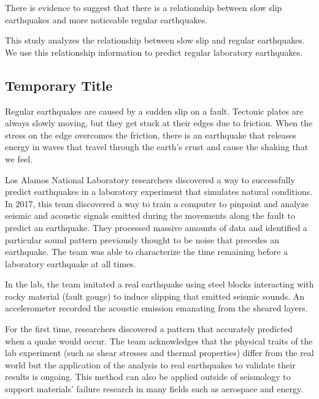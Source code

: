 \documentclass[]{llncs}
\begin{document}
There is evidence to suggest that there is a relationship between slow slip earthquakes and more noticeable regular earthquakes\cite{SlowSlip}. \par

This study analyzes the relationship between slow slip and regular earthquakes. We use this relationship information to predict regular laboratory earthquakes. \par
\subsection{Temporary Title}
Regular earthquakes are caused by a sudden slip on a fault. Tectonic plates are always slowly moving, but they get stuck at their edges due to friction. When the stress on the edge overcomes the friction, there is an earthquake that releases energy in waves that travel through the earth's crust and cause the shaking that we feel.\cite{USGSfaqs}\par

Los Alamos National Laboratory researchers discovered a way to successfully predict earthquakes in a laboratory experiment that simulates natural conditions. In 2017, this team discovered a way to train a computer to pinpoint and analyze seismic and acoustic signals emitted during the movements along the fault to predict an earthquake. They processed massive amounts of data and identified a particular sound pattern previously thought to be noise that precedes an earthquake. The team was able to characterize the time remaining before a laboratory earthquake at all times.\cite{LANLNews} \par
In the lab, the team imitated a real earthquake using steel blocks interacting with rocky material (fault gouge) to induce slipping that emitted seismic sounds. An accelerometer recorded the acoustic emission emanating from the sheared layers.\cite{LANLNews}\par

For the first time, researchers discovered a pattern that accurately predicted when a quake would occur. The team acknowledges that the physical traits of the lab experiment (such as shear stresses and thermal properties) differ from the real world but the application of the analysis to real earthquakes to validate their results is ongoing. This method can also be applied outside of seismology to support materials’ failure research in many fields such as aerospace and energy.\cite{LANLNews}\par
\end{document}
